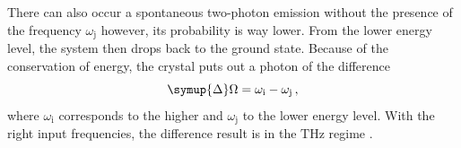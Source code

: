 There can also occur a spontaneous two-photon emission without the presence of the frequency $\omega_\text{j}$ however, its probability is way lower.
From the lower energy level, the system then drops back to the ground state.
Because of the conservation of energy, the crystal puts out a photon of the difference
\begin{equation}
    \symup{\Delta}\Omega = \omega_\text{i} - \omega_\text{j} \, ,
\end{equation}
where $\omega_\text{i}$ corresponds to the higher and $\omega_\text{j}$ to the lower energy level.
With the right input frequencies, the difference result is in the $\si{\tera\hertz}$ regime \cite{boyd2020nonlinear}.



